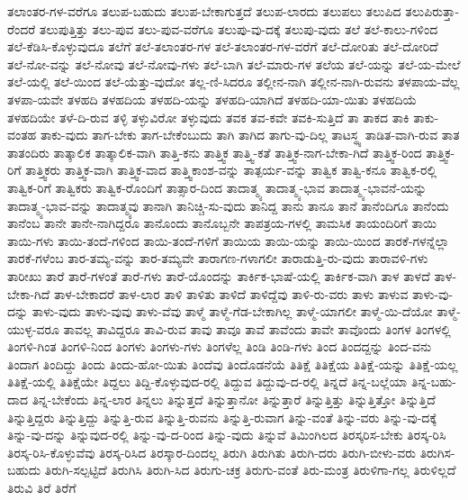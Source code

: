 {ತಲಾಂತರ-ಗಳ-ವರೆಗೂ
ತಲುಪ-ಬಹುದು
ತಲುಪ-ಬೇಕಾಗುತ್ತದೆ
ತಲುಪ-ಲಾರದು
ತಲುಪಲು
ತಲುಪಿದ
ತಲುಪಿರುತ್ತಾ-ರೆಂದರೆ
ತಲುಪುತ್ತಿತ್ತು
ತಲು-ಪುವ
ತಲು-ಪುವ-ವರೆಗೂ
ತಲುಪು-ವು-ದಕ್ಕೆ
ತಲುಪು-ವುದು
ತಲೆ
ತಲೆ-ಕಾಲು-ಗಳಿಂದ
ತಲೆ-ಕೆಡಿಸಿ-ಕೊಳ್ಳುವುದೂ
ತಲೆಗೆ
ತಲೆ-ತಲಾಂತರ-ಗಳ
ತಲೆ-ತಲಾಂತರ-ಗಳ-ವರೆಗೆ
ತಲೆ-ದೋರಿತು
ತಲೆ-ದೋರಿದೆ
ತಲೆ-ನೋ-ವನ್ನು
ತಲೆ-ನೋವು
ತಲೆ-ನೋವು-ಗಳು
ತಲೆ-ಬಾಗಿ
ತಲೆ-ಮಾರು-ಗಳ
ತಲೆಯ
ತಲೆ-ಯನ್ನು
ತಲೆ-ಯ-ಮೇಲೆ
ತಲೆ-ಯಲ್ಲಿ
ತಲೆ-ಯಿಂದ
ತಲೆ-ಯೆತ್ತು-ವುದೋ
ತಲ್ಲ-ಣಿ-ಸಿದರೂ
ತಲ್ಲೀನ-ನಾಗಿ
ತಲ್ಲೀನ-ನಾಗಿ-ರುವನು
ತಳಪಾಯ-ವೆಲ್ಲ
ತಳಪಾ-ಯವೇ
ತಳಹದಿ
ತಳಹದಿಯ
ತಳಹದಿ-ಯನ್ನು
ತಳಹದಿ-ಯಾಗಿದೆ
ತಳಹದಿ-ಯಾ-ಯಿತು
ತಳಹದಿಯೆ
ತಳಹದಿಯೇ
ತಳೆ-ದಿ-ರುವ
ತಳ್ಳಿ
ತಳ್ಳುವಿರೋ
ತಳ್ಳುವುದು
ತವಕ
ತವ-ಕವೇ
ತವಕಿ-ಸುತ್ತಿದೆ
ತಾ
ತಾಕದ
ತಾಕಿ
ತಾಕು-ವಂತಹ
ತಾಕು-ವುದು
ತಾಗ-ಬೇಕು
ತಾಗ-ಬೇಕೆಂಬುದು
ತಾಗಿ
ತಾಗಿದ
ತಾಗು-ವು-ದಿಲ್ಲ
ತಾಟಸ್ಥ್ಯ
ತಾಡಿತ-ವಾಗಿ-ರುವ
ತಾತ
ತಾತಂದಿರು
ತಾತ್ಕಾಲಿಕ
ತಾತ್ಕಾಲಿಕ-ವಾಗಿ
ತಾತ್ತಿ-ಕನು
ತಾತ್ತ್ವಿಕ
ತಾತ್ತ್ವಿ-ಕತೆ
ತಾತ್ತ್ವಿಕ-ನಾಗ-ಬೇಕಾ-ಗಿದೆ
ತಾತ್ತ್ವಿಕ-ರಿಂದ
ತಾತ್ತ್ವಿಕ-ರಿಗೆ
ತಾತ್ತ್ವಿಕರು
ತಾತ್ತ್ವಿಕ-ವಾಗಿ
ತಾತ್ತ್ವಿಕ-ವಾದ
ತಾತ್ತ್ವಿಕಾಂಶ-ವನ್ನು
ತಾತ್ಪರ್ಯ-ವನ್ನು
ತಾತ್ವಿಕ
ತಾತ್ವಿ-ಕನೂ
ತಾತ್ವಿಕ-ರಲ್ಲಿ
ತಾತ್ವಿಕ-ರಿಗೆ
ತಾತ್ವಿಕರು
ತಾತ್ವಿಕ-ರೊಂದಿಗೆ
ತಾತ್ಸಾರ-ದಿಂದ
ತಾದಾತ್ಮ್ಯ
ತಾದಾತ್ಮ್ಯ-ಭಾವ
ತಾದಾತ್ಮ್ಯ-ಭಾವನೆ-ಯನ್ನು
ತಾದಾತ್ಮ್ಯ-ಭಾವ-ವನ್ನು
ತಾದಾತ್ಮ್ಯವು
ತಾನಾಗಿ
ತಾನಿಚ್ಚಿ-ಸು-ವುದು
ತಾನಿದ್ದ
ತಾನು
ತಾನೂ
ತಾನೆ
ತಾನೆಂದಿಗೂ
ತಾನೆಂದು
ತಾನೆಂಬ
ತಾನೇ
ತಾನೇ-ನಾಗಿದ್ದರೂ
ತಾನೊಂದು
ತಾನೊಬ್ಬನೇ
ತಾಪತ್ರಯ-ಗಳಲ್ಲಿ
ತಾಮಸಿಕ
ತಾಯಂದಿರಿಗೆ
ತಾಯಿ
ತಾಯಿ-ಗಳು
ತಾಯಿ-ತಂದೆ-ಗಳಿಂದ
ತಾಯಿ-ತಂದೆ-ಗಳಿಗೆ
ತಾಯಿಯ
ತಾಯಿ-ಯನ್ನು
ತಾಯಿ-ಯಿಂದ
ತಾರಕೆ-ಗಳನ್ನೆಲ್ಲಾ
ತಾರಕೆ-ಗಳೆಂಬ
ತಾರ-ತಮ್ಯ-ವನ್ನು
ತಾರ-ತಮ್ಯವೇ
ತಾರಾಗಣ-ಗಳಾಗಲೀ
ತಾರಾಡುತ್ತಿ-ರು-ವುದು
ತಾರಾವಳಿ-ಗಳು
ತಾರೀಖು
ತಾರೆ
ತಾರೆ-ಗಳಂತೆ
ತಾರೆ-ಗಳು
ತಾರೆ-ಯೊಂದನ್ನು
ತಾರ್ಕಿಕ-ಭಾಷೆ-ಯಲ್ಲಿ
ತಾರ್ಕಿಕ-ವಾಗಿ
ತಾಳ
ತಾಳದೆ
ತಾಳ-ಬೇಕಾ-ಗಿದೆ
ತಾಳ-ಬೇಕಾದರೆ
ತಾಳ-ಲಾರ
ತಾಳಿ
ತಾಳಿತು
ತಾಳಿದೆ
ತಾಳಿದ್ದೆವು
ತಾಳಿ-ರು-ವರು
ತಾಳು
ತಾಳುವ
ತಾಳು-ವು-ದನ್ನು
ತಾಳು-ವುದು
ತಾಳು-ವುವು
ತಾಳು-ವೆವು
ತಾಳ್ಮೆ
ತಾಳ್ಮೆ-ಗೆಡ-ಬೇಕಾಗಿಲ್ಲ
ತಾಳ್ಮೆ-ಯಾಗಲೀ
ತಾಳ್ಮೆ-ಯಿ-ದೆಯೋ
ತಾಳ್ಮೆ-ಯುಳ್ಳ-ವರೂ
ತಾವಲ್ಲ
ತಾವಿದ್ದರೂ
ತಾವಿ-ರುವ
ತಾವು
ತಾವೂ
ತಾವೆ
ತಾವೆಂದು
ತಾವೇ
ತಾವೊಂದು
ತಿಂಗಳ
ತಿಂಗಳಲ್ಲಿ
ತಿಂಗಳಿ-ಗಿಂತ
ತಿಂಗಳಿ-ನಿಂದ
ತಿಂಗಳು
ತಿಂಗಳು-ಗಳು
ತಿಂಗಳೆಲ್ಲ
ತಿಂಡಿ
ತಿಂಡಿ-ಗಳು
ತಿಂದ
ತಿಂದದ್ದನ್ನು
ತಿಂದ-ವನು
ತಿಂದಾಗ
ತಿಂದಿದ್ದು
ತಿಂದು
ತಿಂದು-ಹೋ-ಯಿತು
ತಿಂದೆವು
ತಿಂದೊಡನೆಯೆ
ತಿತಿಕ್ಷೆ
ತಿತಿಕ್ಷೆಯ
ತಿತಿಕ್ಷೆ-ಯನ್ನು
ತಿತಿಕ್ಷೆ-ಯಲ್ಲ
ತಿತಿಕ್ಷೆ-ಯಲ್ಲಿ
ತಿತಿಕ್ಷೆಯೇ
ತಿದ್ದಲು
ತಿದ್ದಿ-ಕೊಳ್ಳುವುದ-ರಲ್ಲಿ
ತಿದ್ದುವ
ತಿದ್ದುವು-ದ-ರಲ್ಲಿ
ತಿನ್ನದೆ
ತಿನ್ನ-ಬಲ್ಲೆಯಾ
ತಿನ್ನ-ಬಹು-ದಾದ
ತಿನ್ನ-ಬೇಕೆಂದು
ತಿನ್ನ-ಲಾರ
ತಿನ್ನಲು
ತಿನ್ನುತ್ತದೆ
ತಿನ್ನುತ್ತಾನೋ
ತಿನ್ನುತ್ತಾರೆ
ತಿನ್ನುತ್ತಿತ್ತು
ತಿನ್ನುತ್ತಿತ್ತೋ
ತಿನ್ನುತ್ತಿದೆ
ತಿನ್ನುತ್ತಿದ್ದರು
ತಿನ್ನುತ್ತಿದ್ದು
ತಿನ್ನುತ್ತಿ-ರುವ
ತಿನ್ನುತ್ತಿ-ರುವನು
ತಿನ್ನುತ್ತಿ-ರುವಾಗ
ತಿನ್ನು-ವಂತೆ
ತಿನ್ನು-ವರು
ತಿನ್ನು-ವು-ದಕ್ಕೆ
ತಿನ್ನು-ವು-ದನ್ನು
ತಿನ್ನುವುದ-ರಲ್ಲಿ
ತಿನ್ನು-ವು-ದ-ರಿಂದ
ತಿನ್ನು-ವುದು
ತಿನ್ನುವೆ
ತಿಮಿಂಗಿಲದ
ತಿರಸ್ಕರಿಸ-ಬೇಕು
ತಿರಸ್ಕ-ರಿಸಿ
ತಿರಸ್ಕ-ರಿಸಿ-ಕೊಳ್ಳುವೆವು
ತಿರಸ್ಕ-ರಿಸಿದ
ತಿರಸ್ಕಾರ-ದಿಂದಲ್ಲ
ತಿರುಗಿ
ತಿರುಗಿತು
ತಿರುಗಿ-ದರು
ತಿರುಗಿ-ಬೀಳು-ವರು
ತಿರುಗಿಸ-ಬಹುದು
ತಿರುಗಿ-ಸಲ್ಪಟ್ಟಿದೆ
ತಿರುಗಿಸಿ
ತಿರುಗಿ-ಸಿದ
ತಿರುಗು-ಚಕ್ರ
ತಿರುಗು-ವಂತೆ
ತಿರು-ಮಂತ್ರ
ತಿರುಳಿಗಾ-ಗಲ್ಲ
ತಿರುಳಿಲ್ಲದೆ
ತಿರುವಿ
ತಿರೆ
ತಿರೆಗೆ
}
